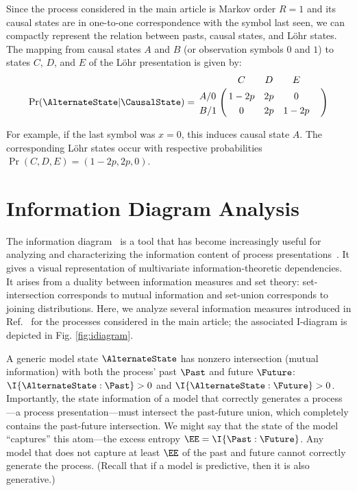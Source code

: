 \documentclass[final,nofootinbib,aps,pre,twocolumn,showpacs,groupaddress,preprintnumbers,floatfix]{revtex4-1}
\begin{document}
Since the process considered in the main article is Markov order $R = 1$ and
its causal states are in one-to-one correspondence with the symbol last seen,
we can compactly represent the relation between pasts, causal states, and L{\"o}hr
states. The mapping from causal states $A$ and $B$ (or observation symbols $0$
and $1$) to states $C$, $D$, and $E$ of the L{\"o}hr presentation is given by:
\begin{align}
\Pr(\AlternateState | \CausalState)
  = \bordermatrix{
    ~   & C    & D  & E    & \cr
    A/0 & 1-2p & 2p & 0    & \cr
    B/1 & 0    & 2p & 1-2p
  }
\label{eq:lohr_map}
\end{align}

For example, if the last symbol was $x = 0$, this induces causal state $A$.
The corresponding L{\"o}hr states occur with respective probabilities $\Pr(C,D,E) =
(1-2p, 2p, 0)$.

\section{Information Diagram Analysis}
\label{sec:idiagram}

The information diagram~\cite{Yeun91a} is a tool that has become increasingly
useful for analyzing and characterizing the information content of process
presentations~\cite{james2017trimming}. It gives a visual representation of
multivariate information-theoretic dependencies. It arises from a duality
between information measures and set theory: set-intersection corresponds to
mutual information and set-union corresponds to joining distributions.  Here, we
analyze several information measures introduced in Ref.~\cite{Crut10a} for the
processes considered in the main article; the associated I-diagram is depicted
in Fig. \ref{fig:idiagram}.

A generic model state $\AlternateState$ has nonzero intersection (mutual
information) with both the process' past $\Past$ and future $\Future$:
$\I{\AlternateState:\Past} > 0$ and $\I{\AlternateState:\Future} > 0$.
Importantly, the state information of a model that correctly generates a
process---a process presentation---must intersect the past-future union, which
completely contains the past-future intersection.  We might say that the state
of the model ``captures'' this atom---the excess entropy $\EE =
\I{\Past:\Future}$. Any model that does not capture at least $\EE$ of the past
and future cannot correctly generate the process. (Recall that if a model is
predictive, then it is also generative.)
\end{document}
